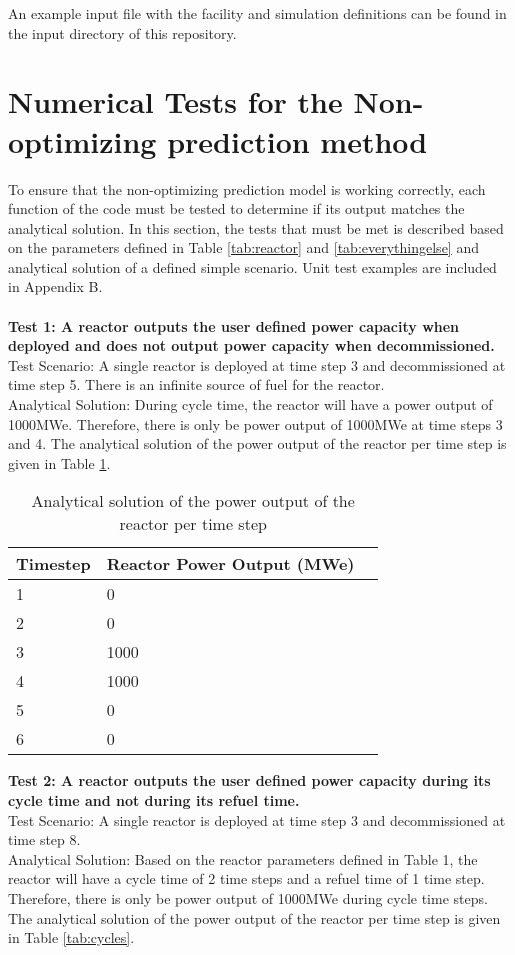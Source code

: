 \documentclass[12pt,letterpaper]{article}
\begin{document}
An example input file with the facility and simulation
definitions can be found in the input directory of this repository.

\newpage

\section{Numerical Tests for the Non-optimizing prediction method}
To ensure that the non-optimizing prediction model is working correctly, each function of the code must be tested to determine if its output matches the analytical solution. In this section, the tests that must be met is described based on the parameters defined in Table \ref{tab:reactor} and \ref{tab:everythingelse} and analytical solution of a defined simple scenario. Unit test examples are included in Appendix B.
\\
\\
\noindent
\textbf{Test 1: A reactor outputs the user defined power capacity when deployed and does not output
power capacity when decommissioned.} \\
Test Scenario: A single reactor is deployed at time step 3 and decommissioned at time step 5. There is an infinite source of fuel for the reactor. \\
Analytical Solution: During cycle time, the reactor will have a power output of 1000MWe. Therefore,
there is only be power output of 1000MWe at time steps 3 and 4. The analytical solution of
the power output of the reactor per time step is given in Table \ref{tab:power}.

\begin{table}[H]
     \centering
    \begin{tabularx}{\textwidth}{bbb}
       \hline
       Timestep & Reactor Power Output (MWe) \\
       \hline
       1 & 0 \\
       2 & 0 \\
       3 & 1000 \\
       4 & 1000 \\
       5 & 0 \\
       6 & 0 \\
       \hline
    \end{tabularx}
    \caption {Analytical solution of the power output of the reactor per time step}
    \label{tab:power}
\end{table}

\noindent
\textbf{Test 2: A reactor outputs the user defined power capacity during its cycle time and not during its refuel time.} \\
Test Scenario: A single reactor is deployed at time step 3 and decommissioned at time step 8. \\
Analytical Solution: Based on the reactor parameters defined in Table 1, the reactor will have a cycle time of 2 time steps and a refuel time of 1 time step. Therefore, there is only be power output of 1000MWe during cycle time steps. The analytical solution of the power output of the reactor per time step is given in Table \ref{tab:cycles}.
\end{document}
